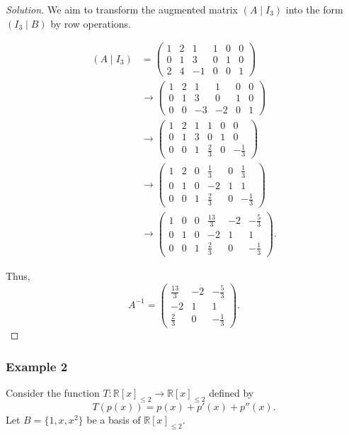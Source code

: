 \documentclass[12pt]{article}
\newenvironment{solution}
{\begin{proof}[Solution]}
{\end{proof}}
\begin{document}
\begin{solution}
We aim to transform the augmented matrix $(A\mid I_3)$ into the form
$(I_3\mid B)$ by row operations.

\begin{align*}
(A\mid I_3)
&=
\left(
\begin{array}{ccc|ccc}
1 & 2 & 1  & 1 & 0 & 0\\
0 & 1 & 3  & 0 & 1 & 0\\
2 & 4 & -1 & 0 & 0 & 1
\end{array}
\right) \\[0.5em]
&\longrightarrow
\left(
\begin{array}{ccc|ccc}
1 & 2 & 1  & 1  & 0 & 0\\
0 & 1 & 3  & 0  & 1 & 0\\
0 & 0 & -3 & -2 & 0 & 1
\end{array}
\right) \\[0.5em]
&\longrightarrow
\left(
\begin{array}{ccc|ccc}
1 & 2 & 1 & 1           & 0 & 0\\
0 & 1 & 3 & 0           & 1 & 0\\
0 & 0 & 1 & \frac{2}{3} & 0 & -\frac{1}{3}
\end{array}
\right) \\[0.5em]
&\longrightarrow
\left(
\begin{array}{ccc|ccc}
1 & 2 & 0 & \frac{1}{3}  & 0 & \frac{1}{3}\\
0 & 1 & 0 & -2            & 1 & 1\\
0 & 0 & 1 & \frac{2}{3}   & 0 & -\frac{1}{3}
\end{array}
\right) \\[0.5em]
&\longrightarrow
\left(
\begin{array}{ccc|ccc}
1 & 0 & 0 & \frac{13}{3} & -2 & -\frac{5}{3}\\
0 & 1 & 0 & -2           & 1  & 1\\
0 & 0 & 1 & \frac{2}{3}  & 0  & -\frac{1}{3}
\end{array}
\right).
\end{align*}

Thus,
\[
\boxed{
A^{-1}
=
\begin{pmatrix}
\frac{13}{3} & -2 & -\frac{5}{3}\\
-2 & 1 & 1\\
\frac{2}{3} & 0 & -\frac{1}{3}
\end{pmatrix}
}.
\]
\end{solution}

\subsubsection{Example 2}
Consider the function $T:\mathbb{R}[x]_{\leq 2}\to\mathbb{R}[x]_{\leq 2}$
defined by
\[
T(p(x))=p(x)+p'(x)+p''(x).
\]
Let $B=\{1,x,x^2\}$ be a basis of $\mathbb{R}[x]_{\leq 2}$.
\end{document}
